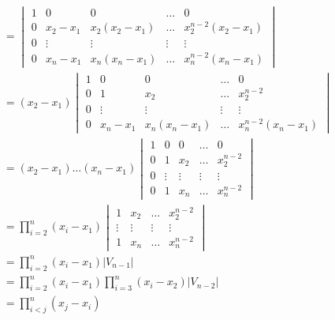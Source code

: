 \documentclass{math}
\begin{document}
\begin{align*}
  &= \begin{vmatrix}
    1 & 0 & 0 & \dots & 0 \\
    0 & x_2-x_1 & x_2(x_2-x_1) & \dots & x_2^{n-2}(x_2-x_1) \\
    0 & \vdots & \vdots & \vdots & \vdots \\
    0 & x_n-x_1 & x_n(x_n-x_1) & \dots & x_n^{n-2}(x_n-x_1)
  \end{vmatrix} \\
  &= (x_2-x_1)\begin{vmatrix}
    1 & 0 & 0 & \dots & 0 \\
    0 & 1 & x_2 & \dots & x_2^{n-2} \\
    0 & \vdots & \vdots & \vdots & \vdots \\
    0 & x_n-x_1 & x_n(x_n-x_1) & \dots & x_n^{n-2}(x_n-x_1)
  \end{vmatrix} \\
  &= (x_2-x_1)\dots(x_n-x_1)\begin{vmatrix}
    1 & 0 & 0 & \dots & 0 \\
    0 & 1 & x_2 & \dots & x_2^{n-2} \\
    0 & \vdots & \vdots & \vdots & \vdots \\
    0 & 1 & x_n & \dots & x_n^{n-2}
  \end{vmatrix} \\
  &= \prod_{i=2}^n(x_i-x_1)\begin{vmatrix}
    1 & x_2 & \dots & x_2^{n-2} \\
    \vdots & \vdots & \vdots & \vdots \\
    1 & x_n & \dots & x_n^{n-2}
  \end{vmatrix} \\
  &= \prod_{i=2}^n(x_i-x_1)|V_{n-1}| \\
  &= \prod_{i=2}^n(x_i-x_1)\prod_{i=3}^n(x_i-x_2)|V_{n-2}| \\
  &= \prod_{i<j}^n(x_j-x_i)
\end{align*}
\end{document}
